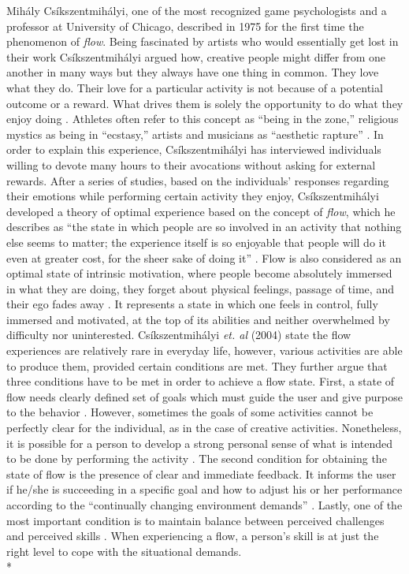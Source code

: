 Mih\'{a}ly Cs\'{i}kszentmih\'{a}lyi, one of the most recognized game psychologists and a professor at University of Chicago, described in 1975 for the first time the phenomenon of \textit{flow}. Being fascinated by artists who would essentially get lost in their work Cs\'{i}kszentmih\'{a}lyi argued how, creative people might differ from one another in many ways but they always have one thing in common. They love what they do. Their love for a particular activity is not because of a potential outcome or a reward. What drives them is solely the opportunity to do what they enjoy doing \cite{csikszentmihalyi1996flow}. Athletes often refer to this concept as ``being in the zone,'' religious mystics
as being in ``ecstasy,'' artists and musicians as ``aesthetic rapture'' \cite{csikszentmihalyi1997finding}. In order to explain this experience, Cs\'{i}kszentmih\'{a}lyi has interviewed individuals willing to devote many hours to their avocations without asking for external rewards. After a series of studies, based on the individuals' responses regarding their emotions while performing certain activity they enjoy, Cs\'{i}kszentmih\'{a}lyi  developed a theory of optimal experience based on the concept of \textit{flow}, which he describes as 
``the state in which people are so involved in an activity that nothing else seems to matter; the experience itself is so enjoyable that people will do it even at greater cost, for the sheer sake of doing it'' \cite{flow1990psychology}. Flow is also considered as an optimal state of intrinsic motivation, where people become absolutely immersed in what they are doing, they forget about physical feelings, passage of time, and their ego fades away \cite{lithiumGamification}. 
It represents a state in which one feels in control, fully immersed and motivated, at the top of its abilities and neither overwhelmed by difficulty nor uninterested. Cs\'{i}kszentmih\'{a}lyi \textit{et. al} (2004) state the flow experiences are relatively rare in everyday life, however, various activities are able to produce them, provided certain conditions are met. They further argue that three conditions have to be met in order to achieve a flow state. First, a state of flow needs clearly defined set of goals which must guide the user and give purpose to the behavior \cite{csikszentmihalyi2014flow}. However, sometimes the goals of some activities cannot be perfectly clear for the individual, as in the case of creative activities. Nonetheless, it is possible for a person to develop a strong personal sense of what is intended to be done by performing the activity \cite{kiili2006evaluations}. The second condition for obtaining the state of flow is the presence  of clear and immediate feedback. It informs the user if he/she is succeeding in a specific goal and how to adjust his or her performance according to the ``continually  changing environment demands'' \cite{csikszentmihalyi2014flow}. Lastly, one of the most important condition is to maintain balance between perceived challenges and perceived skills \cite{csikszentmihalyi2014flow}. When experiencing a flow, a person's skill is at just the right level to cope with the situational demands.\\*

